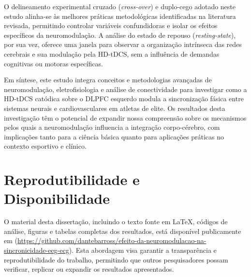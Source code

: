 O delineamento experimental cruzado (\textit{cross-over}) e duplo-cego adotado neste estudo alinha-se às melhores práticas metodológicas identificadas na literatura revisada, permitindo controlar variáveis confundidoras e isolar os efeitos específicos da neuromodulação. A análise do estado de repouso (\textit{resting-state}), por sua vez, oferece uma janela para observar a organização intrínseca das redes cerebrais e sua modulação pela HD-tDCS, sem a influência de demandas cognitivas ou motoras específicas.

Em síntese, este estudo integra conceitos e metodologias avançadas de neuromodulação, eletrofisiologia e análise de conectividade para investigar como a HD-tDCS catódica sobre o DLPFC esquerdo modula a sincronização fásica entre sistemas neurais e cardiovasculares em atletas de elite. Os resultados desta investigação têm o potencial de expandir nossa compreensão sobre os mecanismos pelos quais a neuromodulação influencia a integração corpo-cérebro, com implicações tanto para a ciência básica quanto para aplicações práticas no contexto esportivo e clínico.

\section{Reprodutibilidade e Disponibilidade}
O material desta dissertação, incluindo o texto fonte em \LaTeX, códigos de análise, figuras e tabelas completas dos resultados, está disponível publicamente em  (\url{https://github.com/dantebarross/efeito-da-neuromodulacao-na-sincronicidade-eeg-ecg}). Esta abordagem visa garantir a transparência e reprodutibilidade do trabalho, permitindo que outros pesquisadores possam verificar, replicar ou expandir os resultados apresentados.